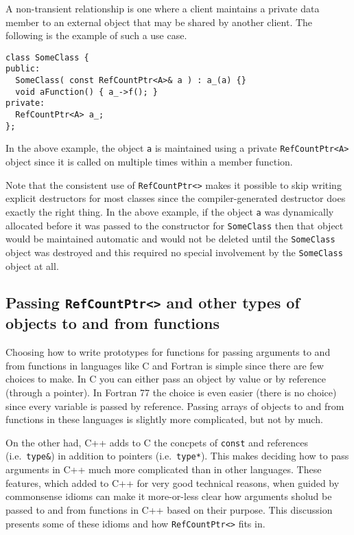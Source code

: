 A non-transient relationship is one where a client maintains a private
data member to an external object that may be shared by another
client.  The following is the example of such a use case.
%
{\scriptsize\begin{verbatim}
class SomeClass {
public:
  SomeClass( const RefCountPtr<A>& a ) : a_(a) {}
  void aFunction() { a_->f(); }
private:
  RefCountPtr<A> a_;
};
\end{verbatim}}
%
\noindent{}
In the above example, the object {}\texttt{a} is maintained using a
private {}\texttt{RefCountPtr<A>} object since it is called on multiple
times within a member function.

Note that the consistent use of {}\texttt{RefCountPtr<>} makes it
possible to skip writing explicit destructors for most classes since
the compiler-generated destructor does exactly the right thing.  In
the above example, if the object {}\texttt{a} was dynamically
allocated before it was passed to the constructor for
{}\texttt{SomeClass} then that object would be maintained automatic
and would not be deleted until the {}\texttt{SomeClass} object was
destroyed and this required no special involvement by the
{}\texttt{SomeClass} object at all.

%
\subsection{Passing {}\texttt{RefCountPtr<>} and other types of objects to and from functions}
\label{rcp:sec:passing-args}
%

Choosing how to write prototypes for functions for passing arguments
to and from functions in languages like C and Fortran is simple since
there are few choices to make.  In C you can either pass an object by
value or by reference (through a pointer).  In Fortran 77 the choice
is even easier (there is no choice) since every variable is passed by
reference.  Passing arrays of objects to and from functions in these
languages is slightly more complicated, but not by much.

On the other had, C++ adds to C the concpets of {}\texttt{const} and
references (i.e.~{}\texttt{type\&}) in addition to pointers
(i.e.~{}\texttt{type*}).  This makes deciding how to pass arguments in
C++ much more complicated than in other languages.  These features,
which added to C++ for very good technical reasons, when guided by
commonsense idioms can make it more-or-less clear how arguments sholud
be passed to and from functions in C++ based on their purpose.  This
discussion presents some of these idioms and how
{}\texttt{RefCountPtr<>} fits in.

